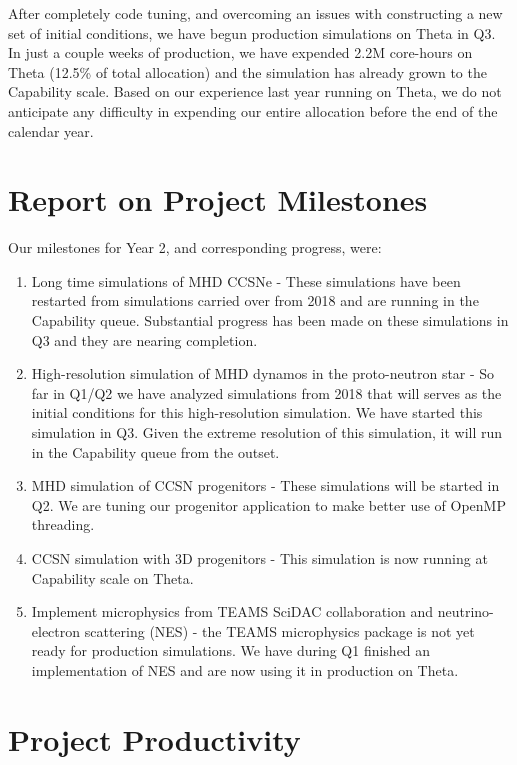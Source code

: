 \documentclass[12pt,titlepage]{article}
\begin{document}
After completely code tuning, and overcoming an issues with constructing a new set of initial conditions, we have begun production simulations on Theta in Q3. 
In just a couple weeks of production, we have expended 2.2M core-hours on Theta (12.5\% of total allocation) and the simulation has already grown to the Capability scale.
Based on our experience last year running on Theta, we do not anticipate any difficulty in expending our entire allocation before the end of the calendar year.

\section{Report on Project Milestones}

Our milestones for Year 2, and corresponding progress, were:
\begin{enumerate}
    \item Long time simulations of MHD CCSNe - These simulations have been restarted from simulations carried over from 2018 and are running in the Capability queue. Substantial progress has been made on these simulations in Q3 and they are nearing completion.
    \item High-resolution simulation of MHD dynamos in the proto-neutron star - So far in Q1/Q2 we have analyzed simulations from 2018 that will serves as the initial conditions for this high-resolution simulation. We have started this simulation in Q3. Given the extreme resolution of this simulation, it will run in the Capability queue from the outset.
    \item MHD simulation of CCSN progenitors - These simulations will be started in Q2. We are tuning our progenitor application to make better use of OpenMP threading.
    \item CCSN simulation with 3D progenitors - This simulation is now running at Capability scale on Theta.
    \item Implement microphysics from TEAMS SciDAC collaboration and neutrino-electron scattering (NES) - the TEAMS microphysics package is not yet ready for production simulations. We have during Q1 finished an implementation of NES and are now using it in production on Theta.
\end{enumerate}



\section{Project Productivity}
\end{document}
